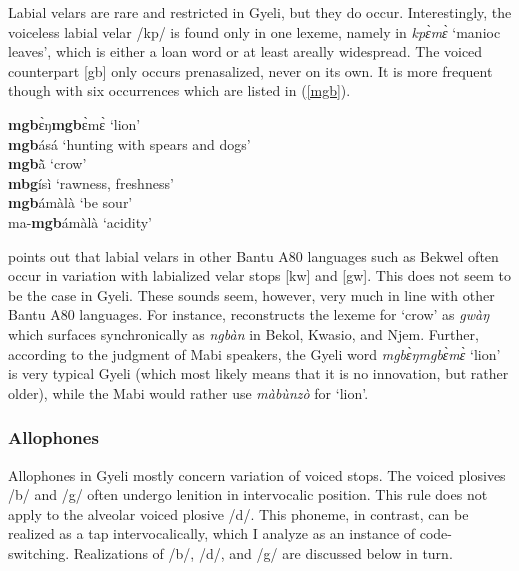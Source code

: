 Labial velars are rare and restricted in Gyeli, but they do occur. Interestingly, the voiceless labial velar /kp/ is found only in one lexeme, namely in {\itshape kpɛ̀mɛ̀} `manioc leaves', which is either a loan word or at least areally widespread. The voiced counterpart [gb] only occurs prenasalized, never on its own. It is more frequent though with six occurrences which are listed in (\ref{mgb}).

\begin{exe} \ex \label{mgb}
{\bfseries mgb}ɛ̀ŋ{\bfseries mgb}ɛ̀mɛ̀ `lion' \\
{\bfseries mgb}ásá `hunting with spears and dogs' \\
{\bfseries mgb}ã̀ `crow' \\
{\bfseries mbg}ísì `rawness, freshness' \\
{\bfseries mgb}ámàlà `be sour' \\
ma-{\bfseries mgb}ámàlà `acidity'
\end{exe}

\citet[148]{cheucle2014} points out that labial velars in other Bantu A80 languages such as Bekwel often occur in variation with labialized velar stops [kw] and [gw]. This does not seem to be the case in Gyeli.
These sounds seem, however, very much in line with other Bantu A80 languages. For instance, \citet[503]{cheucle2014} reconstructs the lexeme for `crow' as {\itshape *gwàŋ} which surfaces synchronically as {\itshape ngbàn} in Bekol, Kwasio, and Njem. Further, according to the judgment of Mabi speakers, the Gyeli word {\itshape mgbɛ̀ŋmgbɛ̀mɛ̀} `lion' is very typical Gyeli (which most likely means that it is no innovation, but rather older), while the Mabi would rather use {\itshape màbùnzò} for `lion'.



\subsubsection{Allophones}
\label{sec:Allo}

Allophones in Gyeli mostly concern variation of voiced stops. The voiced plosives /b/ and /g/ often undergo lenition in intervocalic position.  This rule does not apply to the alveolar voiced plosive /d/. This phoneme, in contrast, can be realized as a tap intervocalically, which I analyze as an instance of code-switching. Realizations of /b/, /d/, and /g/ are discussed below in turn.






